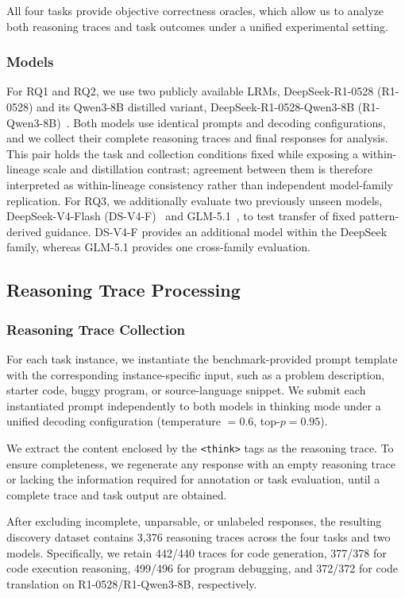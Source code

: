 \documentclass[acmsmall,screen,review,anonymous]{acmart}
\begin{document}
All four tasks provide objective correctness oracles, which allow us to analyze both reasoning traces and task outcomes under a unified experimental setting.

\subsubsection{\textbf{Models}}
For RQ1 and RQ2, we use two publicly available LRMs, DeepSeek-R1-0528 (R1-0528) and its Qwen3-8B distilled variant, DeepSeek-R1-0528-Qwen3-8B (R1-Qwen3-8B)~\cite{deepseekr1}. Both models use identical prompts and decoding configurations, and we collect their complete reasoning traces and final responses for analysis. This pair holds the task and collection conditions fixed while exposing a within-lineage scale and distillation contrast; agreement between them is therefore interpreted as within-lineage consistency rather than independent model-family replication.
For RQ3, we additionally evaluate two previously unseen models, DeepSeek-V4-Flash (DS-V4-F)~\cite{deepseekv4} and GLM-5.1~\cite{glm51}, to test transfer of fixed pattern-derived guidance. DS-V4-F provides an additional model within the DeepSeek family, whereas GLM-5.1 provides one cross-family evaluation.


\subsection{Reasoning Trace Processing}
\label{sec:trace-processing}

\subsubsection{\textbf{Reasoning Trace Collection}}
For each task instance, we instantiate the benchmark-provided prompt template with the corresponding instance-specific input, such as a problem description, starter code, buggy program, or source-language snippet. We submit each instantiated prompt independently to both models in thinking mode under a unified decoding configuration (temperature \(=0.6\), top-\(p=0.95\)).

We extract the content enclosed by the \texttt{<think>} tags as the reasoning trace. To ensure completeness, we regenerate any response with an empty reasoning trace or lacking the information required for annotation or task evaluation, until a complete trace and task output are obtained.

After excluding incomplete, unparsable, or unlabeled responses, the resulting discovery dataset contains 3{,}376 reasoning traces across the four tasks and two models. Specifically, we retain 442/440 traces for code generation, 377/378 for code execution reasoning, 499/496 for program debugging, and 372/372 for code translation on R1-0528/R1-Qwen3-8B, respectively. %
\end{document}
